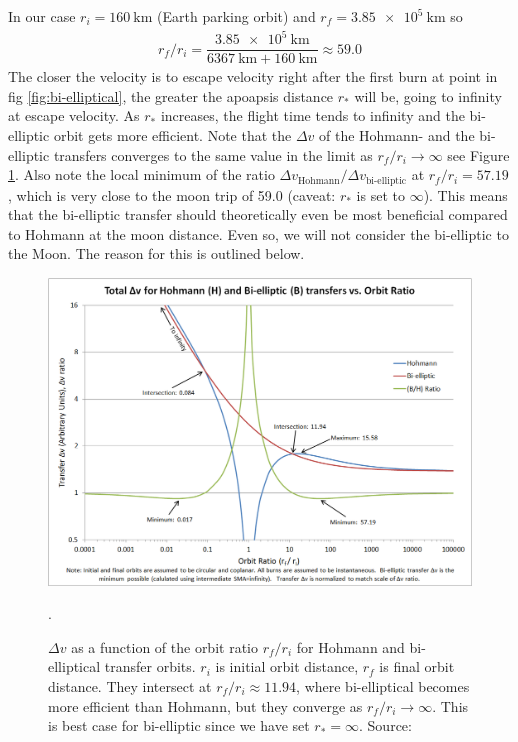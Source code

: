 In our case $r_i = \SI{160}{\km}$ (Earth parking orbit) and $r_f = \SI{3.85e5}{\km}$ so
\begin{align}
r_f/r_i = \dfrac{\SI{3.85e5}{\km}}{\SI{6367}{\km}+\SI{160}{\km}} \approx 59.0
\end{align}
The closer the velocity is to escape velocity right after the first burn at point in fig \ref{fig:bi-elliptical}, the greater the apoapsis distance $r_*$ will be, going to infinity at escape velocity. As $r_*$ increases, the flight time tends to infinity and the bi-elliptic orbit gets more efficient. Note that the $\Delta v$ of the Hohmann- and the bi-elliptic transfers converges to the same value in the limit as $r_f/r_i \to \infty$ see Figure \ref{fig:hohmann_vs_bi-elliptic1}. Also note the local minimum of the ratio $\Delta v_{\text{Hohmann}}/\Delta v_{\text{bi-elliptic}}$ at $r_f/r_i = 57.19$, which is very close to the moon trip of 59.0 (caveat: $r_*$ is set to $\infty$). This means that the bi-elliptic transfer should theoretically even be most beneficial compared to Hohmann at the moon distance. Even so, we will not consider the bi-elliptic to the Moon. The reason for this is outlined below.
\begin{figure}[ht]
\centering
\includegraphics[scale=.47]{fig/hohmann_vs_bi-elliptic1.png}
\caption{$\Delta v$ as a function of the orbit ratio $r_f/r_i$ for Hohmann and bi-elliptical transfer orbits. $r_i$ is initial orbit distance, $r_f$ is final orbit distance. They intersect at $r_f/r_i \approx 11.94$, where bi-elliptical becomes more efficient than Hohmann, but they converge as $r_f/r_i \to \infty$. This is best case for bi-elliptic since we have set $r_*=\infty$. Source:\cite{Copperheadtnp}}.
\label{fig:hohmann_vs_bi-elliptic1}
\end{figure}
